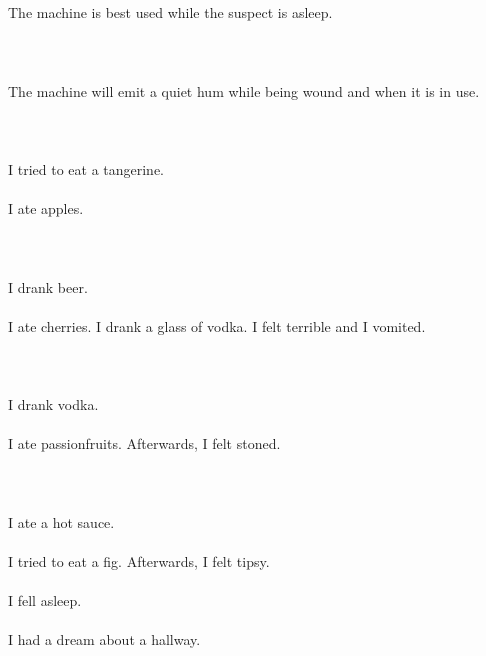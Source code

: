 \documentclass{article}
\begin{document}
    \section{}
    The machine is best used while the suspect is asleep.\\\\ 
    \newpage
    
    \section{}
    The machine will emit a quiet hum while being wound and when it is in use.\\\\ 
    \newpage
    
    \section{}
    I tried to eat a tangerine.\\\\I ate apples.\\\\ 
    \newpage
    
    \section{}
    I drank beer.\\\\I ate cherries. I drank a glass of vodka. I felt terrible and I vomited.\\\\ 
    \newpage
    
    \section{}
    I drank vodka.\\\\I ate passionfruits. Afterwards, I felt stoned.\\\\ 
    \newpage
    
    \section{}
    I ate a hot sauce.\\\\I tried to eat a fig. Afterwards, I felt tipsy.\\\\I fell asleep.\\\\I had a dream about a hallway.\\\\ 
    \newpage
    
\end{document}
